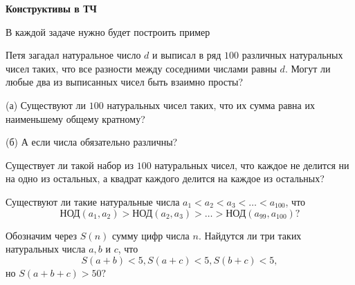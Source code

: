 \centerline{\Huge \bf  Конструктивы в ТЧ}

\begin{flushright}
    \scriptsize{В каждой задаче нужно будет построить пример}
\end{flushright}

Петя загадал натуральное число $d$ и выписал в ряд $100$ различных натуральных чисел таких, что все разности между соседними числами равны $d$. Могут ли любые два из выписанных чисел быть взаимно просты?

(а) Существуют ли $100$ натуральных чисел таких, что их сумма равна их наименьшему общему кратному?

\noindent(б) А если числа обязательно различны?

Существует ли такой набор из $100$ натуральных чисел, что каждое не делится ни на одно из остальных, а квадрат каждого делится на каждое из остальных?

Существуют ли такие натуральные числа $a_1 < a_2 < a_3 < \ldots < a_{100}$, что 
\[\text{НОД}(a_1, a_2) > \text{НОД}(a_2, a_3) > \ldots > \text{НОД}(a_{99}, a_{100})?\]

Обозначим через $S(n)$ сумму цифр числа $n$. Найдутся ли три таких натуральных числа $a, b$ и $c$, что 
\[S(a+b) < 5, S(a+c) < 5, S(b+c) < 5,\]
но $S(a+b+c) > 50?$